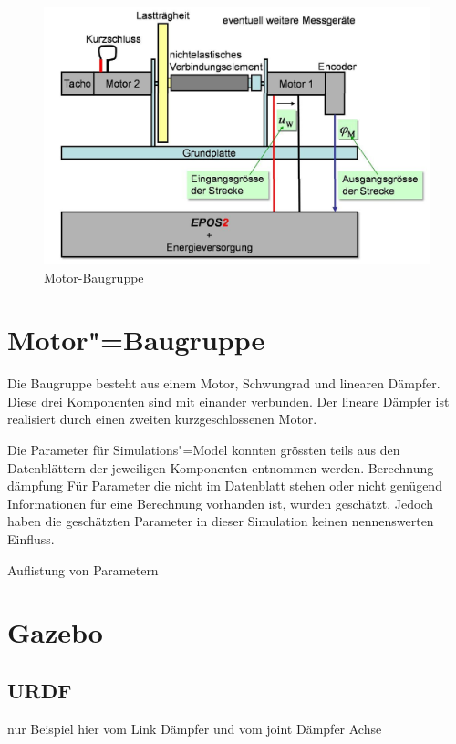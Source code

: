 \begin{figure}[ht!]
	\centering
	\includegraphics[width=14.5cm]{images/motor_baugruppe.png} %
	\caption{Motor-Baugruppe}
	\label{Ab:motor-baugruppe}
\end{figure}

\section{Motor"=Baugruppe}
Die Baugruppe besteht aus einem Motor, Schwungrad und linearen Dämpfer.
Diese drei Komponenten sind mit einander verbunden.
Der lineare Dämpfer ist realisiert durch einen zweiten kurzgeschlossenen Motor.

Die Parameter für Simulations"=Model konnten grössten teils aus den Datenblättern der jeweiligen Komponenten entnommen werden. %
Berechnung dämpfung
Für Parameter die nicht im Datenblatt stehen oder nicht genügend Informationen für eine Berechnung vorhanden ist, wurden geschätzt.
Jedoch haben die geschätzten Parameter in dieser Simulation keinen nennenswerten Einfluss.

Auflistung von Parametern


\section{Gazebo}
\subsection{URDF}
nur Beispiel hier vom Link Dämpfer und vom joint Dämpfer Achse

